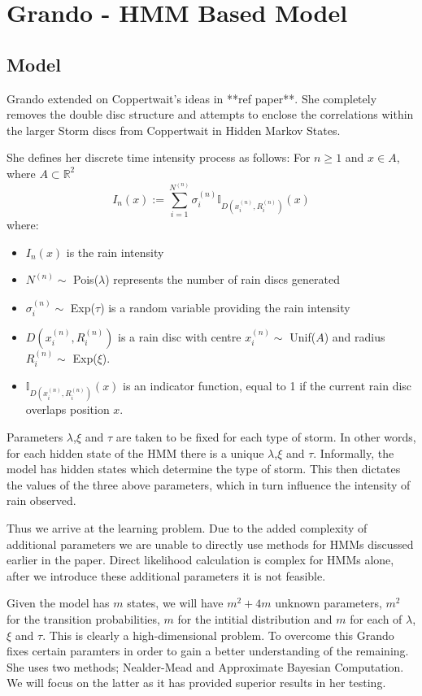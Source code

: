 \section{Grando - HMM Based Model}
\label{grando}
\subsection{Model}
Grando extended on Coppertwait's ideas in **ref paper**. She completely removes the double disc structure and attempts to enclose the correlations within the larger Storm discs from Coppertwait in Hidden Markov States.

She defines her discrete time intensity process as follows:
For $n \geq 1$ and $x \in A$, where $A \subset \mathbb{R}^2$
\begin{equation}
    I_n(x) := \sum_{i=1}^{N^{(n)}} \sigma_i^{(n)} \mathbb{I}_{D(x_i^{(n)},R_i^{(n)})} (x)
\end{equation}
where:
\begin{itemize}
    \item $I_n(x)$ is the rain intensity
    \item $N^{(n)} \sim$ Pois($\lambda$) represents the number of rain discs generated
    \item $\sigma_i^{(n)} \sim$ Exp($\tau$) is a random variable providing the rain intensity
    \item  $D(x_i^{(n)},R_i^{(n)})$ is a rain disc with centre $x_i^{(n)} \sim$ Unif($A$) and radius $R_i^{(n)} \sim$ Exp($\xi$).
    \item $\mathbb{I}_{D(x_i^{(n)},R_i^{(n)})} (x)$ is an indicator function, equal to 1 if the current rain disc overlaps position $x$.
\end{itemize}

Parameters $\lambda$,$\xi$ and $\tau$ are taken to be fixed for each type of storm. In other words, for each hidden state of the HMM there is a unique $\lambda$,$\xi$ and $\tau$. Informally, the model has hidden states which determine the type of storm. This then dictates the values of the three above parameters, which in turn influence the intensity of rain observed.

Thus we arrive at the learning problem. Due to the added complexity of additional parameters we are unable to directly use methods for HMMs discussed earlier in the paper. Direct likelihood calculation is complex for HMMs alone, after we introduce these additional parameters it is not feasible. 

Given the model has $m$ states, we will have $m^2+4m$ unknown parameters, $m^2$ for the transition probabilities, $m$ for the intitial distribution and $m$ for each of $\lambda$,$\xi$ and $\tau$.  This is clearly a high-dimensional problem. To overcome this Grando fixes certain paramters in order to gain a better understanding of the remaining. She uses two methods; Nealder-Mead and Approximate Bayesian Computation. We will focus on the latter as it has provided superior results in her testing.

